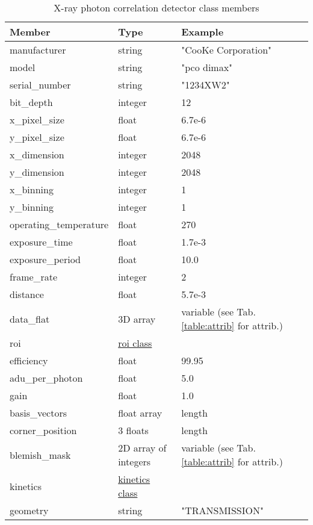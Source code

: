 \begin{table}[h!]\sffamily \footnotesize
\caption{X-ray photon correlation detector class members}

\begin{tabular}{p{3.5cm} p{4.7cm}  p{4.5cm} }
\toprule
\bfseries Member     & \bfseries Type & \bfseries Example \\
\midrule
manufacturer & string & "CooKe Corporation" \\   
model & string &  "pco dimax" \\
serial\_number & string &  "1234XW2" \\  
bit\_depth & integer & 12 \\     
x\_pixel\_size & float & 6.7e-6 \\
y\_pixel\_size & float & 6.7e-6 \\
x\_dimension & integer & 2048 \\
y\_dimension & integer & 2048 \\
x\_binning & integer & 1 \\
y\_binning & integer & 1 \\
operating\_temperature & float &  270 \\     
exposure\_time & float & 1.7e-3 \\
exposure\_period & float & 10.0 \\   
frame\_rate & integer &  2 \\
distance     & float & 5.7e-3\\
data\_flat & 3D array & variable (see Tab. \ref{table:attrib} for attrib.)  \\
roi & \hyperref[table:roi]{roi class} & \\
efficiency & float & 99.95 \\
adu\_per\_photon & float & 5.0 \\
gain & float & 1.0 \\
basis\_vectors & float array & length \\ 
corner\_position & 3 floats & length \\
blemish\_mask & 2D array of integers & variable (see Tab. \ref{table:attrib} for attrib.)  \\
kinetics & \hyperref[table:kinetics]{kinetics class} & \\
geometry & string & "TRANSMISSION" \\
\bottomrule
\end{tabular}
\end{table}


